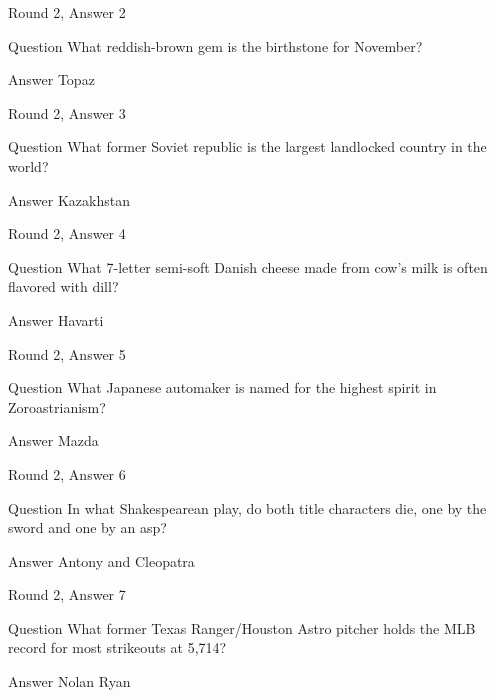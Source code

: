 \documentclass[11pt]{beamer}
\begin{document}
\begin{frame}{Round 2, Answer 2}
\begin{block}{Question}
What reddish-brown gem is the birthstone for November\@?
\end{block}
\pause{}
\begin{block}{Answer}
Topaz
\end{block}
\end{frame}
    

\begin{frame}{Round 2, Answer 3}
\begin{block}{Question}
What former Soviet republic is the largest landlocked country in the world\@?
\end{block}
\pause{}
\begin{block}{Answer}
Kazakhstan
\end{block}
\end{frame}
    

\begin{frame}{Round 2, Answer 4}
\begin{block}{Question}
What 7-letter semi-soft Danish cheese made from cow's milk is often flavored with dill\@?
\end{block}
\pause{}
\begin{block}{Answer}
Havarti
\end{block}
\end{frame}
    

\begin{frame}{Round 2, Answer 5}
\begin{block}{Question}
What Japanese automaker is named for the highest spirit in Zoroastrianism\@?
\end{block}
\pause{}
\begin{block}{Answer}
Mazda
\end{block}
\end{frame}
    

\begin{frame}{Round 2, Answer 6}
\begin{block}{Question}
In what Shakespearean play, do both title characters die, one by the sword and one by an asp\@?
\end{block}
\pause{}
\begin{block}{Answer}
Antony and Cleopatra
\end{block}
\end{frame}
    

\begin{frame}{Round 2, Answer 7}
\begin{block}{Question}
What former Texas Ranger/Houston Astro pitcher holds the MLB record for most strikeouts at 5,714\@?
\end{block}
\pause{}
\begin{block}{Answer}
Nolan Ryan
\end{block}
\end{frame}
    
\end{document}
